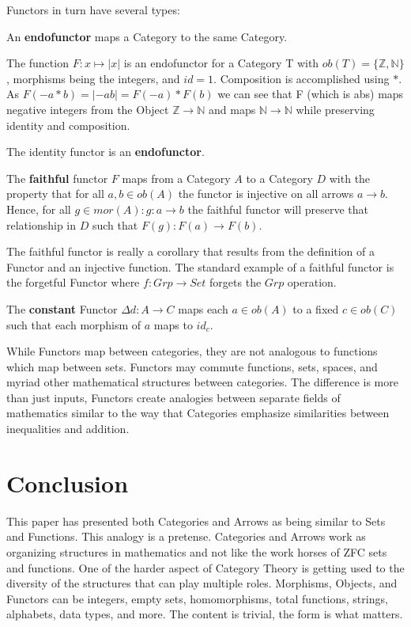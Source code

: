 \documentclass{article}
\begin{document}
Functors in turn have several types:
\begin{definition}
    An \textbf{endofunctor} maps a Category to the same Category.
\end{definition}
\begin{example}
The function $F: x \mapsto |x|$ is an endofunctor for a Category T with $ob(T) = \{\mathbb{Z}, \mathbb{N}\}$, morphisms being the integers, and $id = 1$. Composition is accomplished using $*$. As $F(-a * b) = |-ab| = F(-a) * F(b)$ we can see that F (which is abs) maps negative integers from the Object $\mathbb{Z} \to \mathbb{N}$ and maps $\mathbb{N} \to \mathbb{N}$ while preserving identity and composition.
\end{example}
\begin{corollary}
  The identity functor is an \textbf{endofunctor}.
\end{corollary}
\begin{definition}
    The \textbf{faithful} functor $F$ maps from a Category $A$ to a Category $D$ with the property that for all $a,b \in ob(A)$ the functor is injective on all arrows $a \to b$. Hence, for all $g \in mor(A): g: a \to b$ the faithful functor will preserve that relationship in $D$ such that $F(g): F(a) \to F(b)$.
\end{definition}
\begin{example}
    The faithful functor is really a corollary that results from the definition of a Functor and an injective function. The standard example of a faithful functor is the forgetful Functor where $f: Grp \to Set$ forgets the $Grp$ operation.
\end{example}
\begin{definition}
    The \textbf{constant} Functor $\Delta d: A \to C$ maps each $a \in ob(A)$ to a fixed $c \in ob(C)$ such that each morphism of $a$ maps to $id_c$.
\end{definition}
While Functors map between categories, they are not analogous to functions which map between sets. Functors may commute functions, sets, spaces, and myriad other mathematical structures between categories. The difference is more than just inputs, Functors create analogies between separate fields of mathematics similar to the way that Categories emphasize similarities between inequalities and addition.

\section{Conclusion}
This paper has presented both Categories and Arrows as being similar to Sets and Functions. This analogy is a pretense. Categories and Arrows work as organizing structures in mathematics and not like the work horses of ZFC sets and functions. One of the harder aspect of Category Theory is getting used to the diversity of the structures that can play multiple roles. Morphisms, Objects, and Functors can be integers, empty sets, homomorphisms, total functions, strings, alphabets, data types, and more. The content is trivial, the form is what matters.


\end{document}
